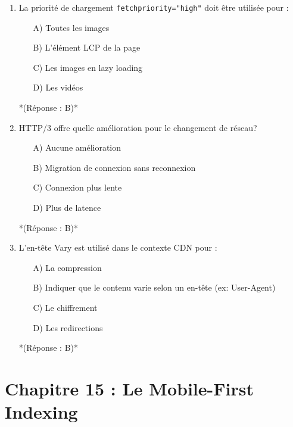 \documentclass[12pt,a4paper,twoside]{report}
\begin{document}
\begin{enumerate}
\item La priorité de chargement \texttt{fetchpriority="high"} doit être utilisée pour :
\begin{itemize}
\item[A)] Toutes les images
\item[B)] L'élément LCP de la page
\item[C)] Les images en lazy loading
\item[D)] Les vidéos
\end{itemize}
*(Réponse : B)*

\item HTTP/3 offre quelle amélioration pour le changement de réseau?
\begin{itemize}
\item[A)] Aucune amélioration
\item[B)] Migration de connexion sans reconnexion
\item[C)] Connexion plus lente
\item[D)] Plus de latence
\end{itemize}
*(Réponse : B)*

\item L'en-tête Vary est utilisé dans le contexte CDN pour :
\begin{itemize}
\item[A)] La compression
\item[B)] Indiquer que le contenu varie selon un en-tête (ex: User-Agent)
\item[C)] Le chiffrement
\item[D)] Les redirections
\end{itemize}
*(Réponse : B)*

\end{enumerate}

\section*{Chapitre 15 : Le Mobile-First Indexing}
\end{document}
